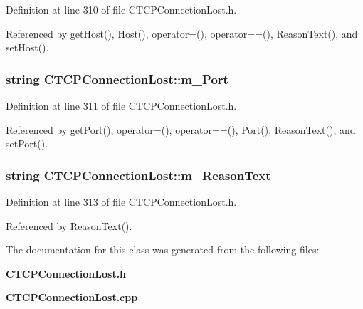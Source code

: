 Definition at line 310 of file CTCPConnection\-Lost.h.

Referenced by get\-Host(), Host(), operator=(), operator==(), Reason\-Text(), and set\-Host().
\subsubsection{\setlength{\rightskip}{0pt plus 5cm}string CTCPConnection\-Lost::m\_\-Port\hspace{0.3cm}{\tt  [private]}}\label{classCTCPConnectionLost_o1}




Definition at line 311 of file CTCPConnection\-Lost.h.

Referenced by get\-Port(), operator=(), operator==(), Port(), Reason\-Text(), and set\-Port().
\subsubsection{\setlength{\rightskip}{0pt plus 5cm}string CTCPConnection\-Lost::m\_\-Reason\-Text\hspace{0.3cm}{\tt  [private]}}\label{classCTCPConnectionLost_o2}




Definition at line 313 of file CTCPConnection\-Lost.h.

Referenced by Reason\-Text().

The documentation for this class was generated from the following files:\begin{CompactItemize}
\item 
{\bf CTCPConnection\-Lost.h}\item 
{\bf CTCPConnection\-Lost.cpp}\end{CompactItemize}

